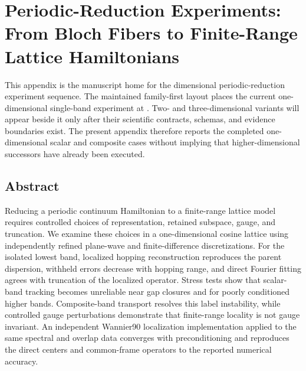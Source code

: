 \chapter[Periodic-Reduction Experiments]{Periodic-Reduction Experiments: From Bloch Fibers to Finite-Range Lattice Hamiltonians}

\label{app:one-dimensional-reduction}


This appendix is the manuscript home for the dimensional periodic-reduction experiment
sequence. The maintained family-first layout places the current one-dimensional
single-band experiment at
.
Two- and three-dimensional variants will appear beside it only after their scientific
contracts, schemas, and evidence boundaries exist. The present appendix therefore
reports the completed one-dimensional scalar and composite cases without implying that
higher-dimensional successors have already been executed.

\section*{Abstract}

Reducing a periodic continuum Hamiltonian to a finite-range lattice model
requires controlled choices of representation, retained subspace, gauge, and
truncation. We examine these choices in a one-dimensional cosine lattice using
independently refined plane-wave and finite-difference discretizations. For the
isolated lowest band, localized hopping reconstruction reproduces the parent
dispersion, withheld errors decrease with hopping range, and direct Fourier
fitting agrees with truncation of the localized operator. Stress tests show that
scalar-band tracking becomes unreliable near gap closures and for poorly
conditioned higher bands. Composite-band transport resolves this label
instability, while controlled gauge perturbations demonstrate that finite-range
locality is not gauge invariant. An independent Wannier90 localization implementation applied
to the same spectral and overlap data converges with preconditioning and
reproduces the direct centers and common-frame operators to the reported
numerical accuracy.

